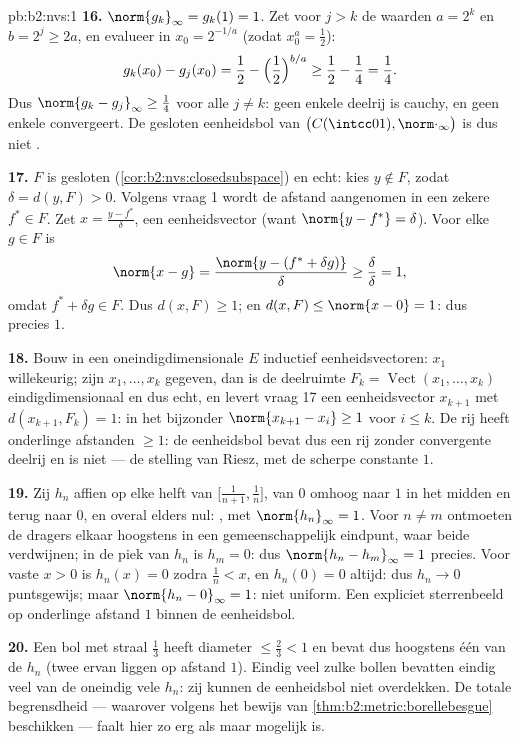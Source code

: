 \begin{solution}{pb:b2:nvs:1}
\textbf{16.} $\norm{g_k}_\infty = g_k(1) = 1$. Zet voor $j > k$ de
waarden $a = 2^k$ en $b = 2^j \geq 2a$, en evalueer in $x_0 =
2^{-1/a}$ (zodat $x_0^a = \frac12$):
\[
g_k(x_0) - g_j(x_0) = \frac12 - \Bigl(\frac12\Bigr)^{b/a}
\geq \frac12 - \frac14 = \frac14 .
\]
Dus $\norm{g_k - g_j}_\infty \geq \frac14$ voor alle $j \neq k$:
geen enkele deelrij is cauchy, en geen enkele convergeert. De
gesloten eenheidsbol van $\bigl(C(\intcc01),
\norm\cdot_\infty\bigr)$ is dus niet .

\textbf{17.} $F$ is gesloten (\cref{cor:b2:nvs:closedsubspace}) en
echt: kies $y \notin F$, zodat $\delta = d(y, F) > 0$. Volgens
vraag 1 wordt de afstand aangenomen in een zekere $f^* \in F$. Zet
$x = \frac{y - f^*}{\delta}$, een eenheidsvector (want $\norm{y -
f^*} = \delta$). Voor elke $g \in F$ is
\[
\norm{x - g} = \frac{\norm{y - (f^* + \delta g)}}{\delta}
\geq \frac{\delta}{\delta} = 1 ,
\]
omdat $f^* + \delta g \in F$. Dus $d(x, F) \geq 1$; en $d(x, F)
\leq \norm{x - 0} = 1$: dus precies $1$.

\textbf{18.} Bouw in een oneindigdimensionale $E$ inductief
eenheidsvectoren: $x_1$ willekeurig; zijn $x_1, \dots, x_k$
gegeven, dan is de deelruimte $F_k = \operatorname{Vect}(x_1,
\dots, x_k)$ eindigdimensionaal en dus echt, en levert vraag 17 een
eenheidsvector $x_{k+1}$ met $d(x_{k+1}, F_k) = 1$: in het
bijzonder $\norm{x_{k+1} - x_i} \geq 1$ voor $i \leq k$. De rij
heeft onderlinge afstanden $\geq 1$: de eenheidsbol bevat dus een
rij zonder convergente deelrij en is niet  --- de stelling
van Riesz, met de scherpe constante $1$.

\textbf{19.} Zij $h_n$ affien op elke helft van
$\bigl[\frac1{n+1}, \frac1n\bigr]$, van $0$ omhoog naar $1$ in het
midden en terug naar $0$, en overal elders nul: , met
$\norm{h_n}_\infty = 1$. Voor $n \neq m$ ontmoeten de dragers
elkaar hoogstens in een gemeenschappelijk eindpunt, waar beide
verdwijnen; in de piek van $h_n$ is $h_m = 0$: dus $\norm{h_n -
h_m}_\infty = 1$ precies. Voor vaste $x > 0$ is $h_n(x) = 0$ zodra
$\frac1n < x$, en $h_n(0) = 0$ altijd: dus $h_n \to 0$
puntsgewijs; maar $\norm{h_n - 0}_\infty = 1$: niet uniform. Een
expliciet sterrenbeeld op onderlinge afstand $1$ binnen de
eenheidsbol.

\textbf{20.} Een bol met straal $\frac13$ heeft diameter $\leq
\frac23 < 1$ en bevat dus hoogstens één van de $h_n$ (twee ervan
liggen op afstand $1$). Eindig veel zulke bollen bevatten eindig
veel van de oneindig vele $h_n$: zij kunnen de eenheidsbol niet
overdekken. De totale begrensdheid --- waarover  volgens het bewijs van
\cref{thm:b2:metric:borellebesgue} beschikken --- faalt hier zo
erg als maar mogelijk is.


\end{solution}
